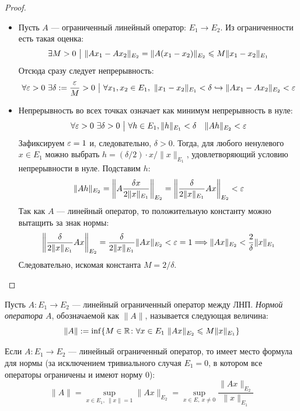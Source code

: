 \begin{proof}~
    \begin{itemize}
        \item Пусть $A$ --- ограниченный линейный оператор: $E_1 \to E_2$. Из ограниченности есть такая оценка:
        \[
            \exists M > 0 \ \big|\  \|Ax_1 - Ax_2\|_{E_2} = \|A(x_1 - x_2)\|_{E_2} \leqslant M\|x_1 - x_2\|_{E_1}
        \]
        Отсюда сразу следует непрерывность:
        \[
            \forall \eps > 0\ \exists \delta := \frac{\eps}{M} > 0 \such \forall x_1, x_2 \in E_1,\  \|x_1 - x_2\|_{E_1} < \delta \emb \|Ax_1 - Ax_2\|_{E_2} < \eps
        \]
        
        \item Непрерывность во всех точках означает как минимум непрерывность в нуле:
        \[
            \forall \varepsilon > 0\ \exists \delta > 0 \ \big|\  \forall h \in E_1, \|h\|_{E_1} < \delta \quad \|Ah\|_{E_2} < \varepsilon
        \] 
        Зафиксируем $\varepsilon = 1$ и, следовательно, $\delta > 0$. Тогда, для любого ненулевого $x \in E_1$ можно выбрать $h = (\delta / 2) \cdot x / \|x\|_{E_1}$, удовлетворяющий условию непрерывности в нуле. Подставим $h$:
        \[
        	\|Ah\|_{E_2} = \left\|A \frac{\delta x}{2\|x\|_{E_1}}\right\|_{E_2} = \left\|\frac{\delta}{2\|x\|_{E_1}}Ax\right\|_{E_2} < \varepsilon
        \]
        Так как $A$ --- линейный оператор, то положительную константу можно вытащить за знак нормы:
        \[
              \left\|\frac{\delta}{2\|x\|_{E_1}}Ax\right\|_{E_2} = \frac{\delta}{2\|x\|_{E_1}}\|Ax\|_{E_2} < \varepsilon = 1 \Longrightarrow \|Ax\|_{E_2} < \frac{2}{\delta}\|x\|_{E_1}
        \]
        Следовательно, искомая константа $M = 2 / \delta$.
    \end{itemize}
\end{proof}

\begin{definition}
    Пусть $A \colon E_1 \to E_2$ --- линейный ограниченный оператор между ЛНП. \textit{Нормой оператора} $A$, обозначаемой как $\|A\|$, называется следующая величина:
    \[
    	\|A\| := \inf \{M \in \mathbb{R} \colon \forall x \in E_1\ \|Ax\|_{E_2} \leqslant M\|x\|_{E_1}\}
    \]
\end{definition}

\begin{proposition}
    Если $A \colon E_1 \to E_2$ --- линейный ограниченный оператор, то имеет место формула для нормы (за исключением тривиального случая $E_1 = 0$, в котором все операторы ограничены и имеют норму $0$):
    \[
        \|A\| = \sup_{x \in E_1,\ \|x\| = 1} \|Ax\|_{E_2} = \sup_{x \in E,\ x \neq 0} \frac{\|Ax\|_{E_2}}{\|x\|_{E_1}} 
    \]
\end{proposition}

